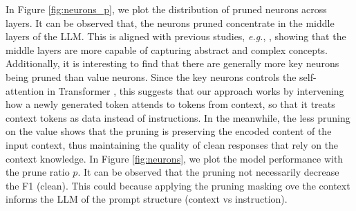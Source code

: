 In Figure \ref{fig:neurons_p}, we plot the distribution of pruned neurons across layers. It can be observed that,
the neurons pruned concentrate in the middle layers of the LLM.
This is aligned with previous studies, \emph{e.g.}, \citet{huang2024learn}, showing that the middle layers are more capable of capturing abstract and complex concepts.
Additionally, it is interesting to find that there are generally more key neurons being pruned than value neurons. Since the key neurons controls the self-attention in Transformer \cite{geva2021transformer}, this suggests that our approach works by intervening how a newly generated token attends to tokens from context, so that it treats context tokens as data instead of instructions. 
In the meanwhile, the less pruning on the value shows that the pruning is preserving the encoded content of the input context, thus maintaining the quality of clean responses that rely on the context knowledge.
In Figure \ref{fig:neurons}, we plot the model performance with the prune ratio $p$. 
It can be observed that the pruning not necessarily decrease the F1 (clean). 
This could because applying the pruning masking ove the context informs the LLM of the prompt structure (context vs instruction).

